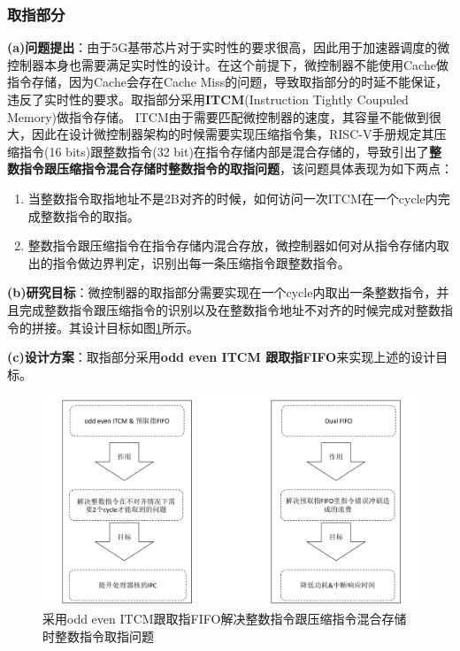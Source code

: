 \documentclass[a4paper, 12pt]{article}
\begin{document}
\subsubsection{取指部分}
\textbf{(a)问题提出}：由于5G基带芯片对于实时性的要求很高\cite{kim2020flexible}，因此用于加速器调度的微控制器本身也需要满足实时性的设计。在这个前提下，微控制器不能使用Cache做指令存储，因为Cache会存在Cache Miss的问题\cite{duran2020energy}，导致取指部分的时延不能保证，违反了实时性的要求。取指部分采用\textbf{ITCM}(Instruction Tightly Coupuled Memory)做指令存储。
ITCM由于需要匹配微控制器的速度，其容量不能做到很大，因此在设计微控制器架构的时候需要实现压缩指令集\cite{tabanelli2022optimizing}，RISC-V手册规定其压缩指令(16 bits)跟整数指令(32 bit)在指令存储内部是混合存储的\cite{balas2021risc}，导致引出了\textbf{整数指令跟压缩指令混合存储时整数指令的取指问题}\cite{scheipel2022moremcu}，该问题具体表现为如下两点：
\begin{enumerate}
  \item 当整数指令取指地址不是2B对齐的时候，如何访问一次ITCM在一个cycle内完成整数指令的取指。
  \item 整数指令跟压缩指令在指令存储内混合存放，微控制器如何对从指令存储内取出的指令做边界判定，识别出每一条压缩指令跟整数指令。
\end{enumerate}

\textbf{(b)研究目标}：微控制器的取指部分需要实现在一个cycle内取出一条整数指令，并且完成整数指令跟压缩指令的识别以及在整数指令地址不对齐的时候完成对整数指令的拼接。其设计目标如图\ref{fig:if_design_features}所示。

\textbf{(c)设计方案}：取指部分采用\textbf{odd even ITCM 跟取指FIFO}来实现上述的设计目标。
\begin{figure}
  \centering
  \includegraphics[width=0.8\linewidth]{./images/if_design_features.pdf}
  \caption{采用odd even ITCM跟取指FIFO解决整数指令跟压缩指令混合存储时整数指令取指问题}
  \label{fig:if_design_features}
\end{figure}
\end{document}
